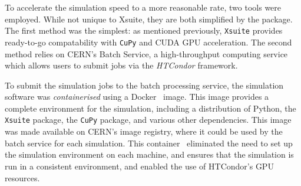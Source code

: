 \documentclass[11pt]{report}
\begin{document}
To accelerate the simulation speed to a more reasonable rate, two tools were employed. While not unique to Xsuite, they are both simplified by the package. The first method was the simplest: as mentioned previously, \verb|Xsuite| provides ready-to-go compatability with \verb|CuPy| and CUDA GPU acceleration. The second method relies on CERN's Batch Service, a high-throughput computing service which allows users to submit jobs via the \textit{HTCondor} framework. 

To submit the simulation jobs to the batch processing service, the simulation software was \textit{containerised} using a Docker~\cite{merkel2014docker} image. This image provides a complete environment for the simulation, including a distribution of Python, the \verb|Xsuite| package, the \verb|CuPy| package, and various other dependencies. This image was made available on CERN's image registry, where it could be used by the batch service for each simulation. This container~\cite{docker} eliminated the need to set up the simulation environment on each machine, and ensures that the simulation is run in a consistent environment, and enabled the use of HTCondor's GPU resources. 
\end{document}
